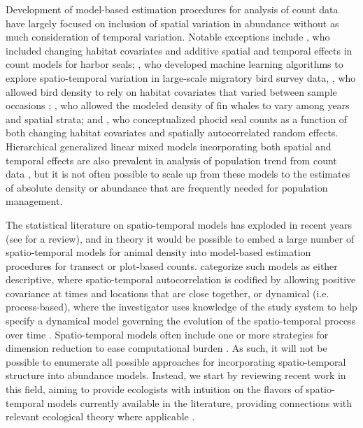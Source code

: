 \documentclass[12pt,english]{article}
\begin{document}
\begin{spacing}{1.9}
Development of model-based estimation procedures for analysis of count data have largely focused on inclusion of spatial variation in abundance without as much consideration of temporal variation.  Notable exceptions include \citet{VerHoefJansen2007}, who included changing habitat covariates and additive spatial and temporal effects in count models for harbor seals; \citet{FinkEtAl2010}, who developed machine learning algorithms to explore spatio-temporal variation in large-scale migratory bird survey data, \citet{MillerEtAl11jwm}, who allowed bird density to rely on habitat covariates that varied between sample occasions \citep[using an N-mixture formulation; see][]{Royle2004}; \citet{Moore2011}, who allowed the modeled density of fin whales to vary among years and spatial strata; and \citet{VerHoefEtAl2014}, who conceptualized phocid seal counts as a function of both changing habitat covariates and spatially autocorrelated random effects.  Hierarchical generalized linear mixed models incorporating both spatial and temporal effects are also prevalent in analysis of population trend from count data \citep{SauerLink2011,RossEtAl2012}, but it is not often possible to scale up from these models to the estimates of absolute density or abundance that are frequently needed for population management.

The statistical literature on spatio-temporal models has exploded in recent years (see \citeauthor{CressieWikle2011} \citeyear{CressieWikle2011} for a review), and in theory it would be possible to embed a large number of spatio-temporal models for animal density into model-based estimation procedures for transect or plot-based counts.  \citet{CressieWikle2011} categorize such models as either descriptive, where spatio-temporal autocorrelation is codified by allowing positive covariance at times and locations that are close together, or dynamical (i.e. process-based), where the investigator uses knowledge of the study system to help specify a dynamical model governing the evolution of the spatio-temporal process over time \citep[e.g., via difference equations;][]{WikleHooten2010}.  Spatio-temporal models often include one or more strategies for dimension reduction to ease computational burden \citep[of which there are many; for a review see][]{Wikle2010}.  As such, it will not be possible to enumerate all possible approaches for incorporating spatio-temporal structure into abundance models.
Instead, we start by reviewing recent work in this field, aiming to provide ecologists with intuition on the flavors of spatio-temporal models currently available in the literature, providing connections with relevant ecological theory where applicable \citep[e.g., with ideal free distributions;][]{FretwellLucas1970}.


\end{spacing}
\end{document}
